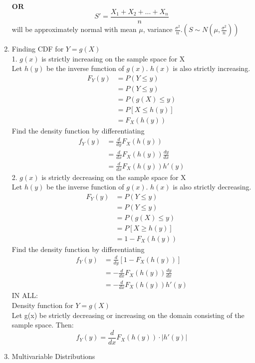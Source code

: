 \documentclass[10pt]{article}
\begin{document}
\begin{multicols}{2}
\begin{enumerate}
			$\textbf{OR}$\\
			$$S' = \frac{X_1 + X_2 + \dots + X_n}{n}$$
			will be approximately normal with mean $\mu$, variance $\frac{\sigma^2}{n}$.$(S\sim N(\mu, \frac{\sigma^2}{n}))$\\
			\item Finding CDF for $Y = g(X)$\\
			1. $g(x)$ is strictly increasing on the sample space for X\\
			Let $h(y)$ be the inverse function of $g(x)$. $h(x)$ is also strictly increasing.
			\begin{align*}
				F_Y(y) &= P(Y\le y)\\
				&= P(Y\le y)\\
				&= P(g(X) \le y)\\
				&= P[X \le h(y)]\\
				&= F_X(h(y))
			\end{align*}
			Find the density function by differentiating
			\begin{align*}
				f_Y(y) &= \frac{d}{dy}F_X(h(y))\\
				&= \frac{d}{dx}F_X(h(y))\frac{dy}{dx}\\
				&= \frac{d}{dx}F_X(h(y))h'(y)
			\end{align*}
			2. $g(x)$ is strictly decreasing on the sample space for X\\
			Let $h(y)$ be the inverse function of $g(x)$. $h(x)$ is also strictly decreasing.\\
			\begin{align*}
				F_Y(y) &= P(Y\le y)\\
				&= P(Y\le y)\\
				&= P(g(X) \le y)\\
				&= P[X \ge h(y)]\\
				&= 1 - F_X(h(y))
			\end{align*}
			Find the density function by differentiating
			\begin{align*}
				f_Y(y) &= \frac{d}{dy}[1-F_X(h(y))]\\
				&= -\frac{d}{dx}F_X(h(y))\frac{dy}{dx}\\
				&= -\frac{d}{dx}F_X(h(y))h'(y)
			\end{align*}
			IN ALL:\\
			Density function for $Y = g(X)$\\
			Let g(x) be strictly decreasing or increasing on the domain consisting of the sample space. Then:
			$$f_Y(y) = \frac{d}{dx}F_X(h(y)) \cdot |h'(y)|$$
			\item Multivariable Distributions

\end{enumerate}
\end{multicols}
\end{document}
